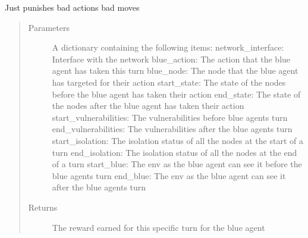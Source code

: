 \documentclass[letterpaper,10pt,english]{sphinxmanual}
\begin{document}
\begin{fulllineitems}
\label{\detokenize{source/yawning_titan.envs.generic.core:yawning_titan.envs.generic.core.reward_functions.punish_bad_actions}}
\sphinxAtStartPar
Just punishes bad actions bad moves
\begin{quote}\begin{description}
\item[{Parameters}] \leavevmode
\sphinxAtStartPar
{} \textendash{} A dictionary containing the following items:
network\_interface: Interface with the network
blue\_action: The action that the blue agent has taken this turn
blue\_node: The node that the blue agent has targeted for their action
start\_state: The state of the nodes before the blue agent has taken their action
end\_state: The state of the nodes after the blue agent has taken their action
start\_vulnerabilities: The vulnerabilities before blue agents turn
end\_vulnerabilities: The vulnerabilities after the blue agents turn
start\_isolation: The isolation status of all the nodes at the start of a turn
end\_isolation: The isolation status of all the nodes at the end of a turn
start\_blue: The env as the blue agent can see it before the blue agents turn
end\_blue: The env as the blue agent can see it after the blue agents turn

\item[{Returns}] \leavevmode
\sphinxAtStartPar
The reward earned for this specific turn for the blue agent

\end{description}\end{quote}

\end{fulllineitems}

\end{document}

